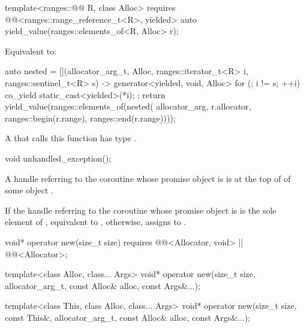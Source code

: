 %
\begin{itemdecl}
template<ranges::@@ R, class Alloc>
  requires @@<ranges::range_reference_t<R>, yielded>
  auto yield_value(ranges::elements_of<R, Alloc> r);
\end{itemdecl}

\begin{itemdescr}
\pnum
\effects
Equivalent to:
\begin{codeblock}
auto nested = [](allocator_arg_t, Alloc, ranges::iterator_t<R> i, ranges::sentinel_t<R> s)
  -> generator<yielded, void, Alloc> {
    for (; i != s; ++i) {
      co_yield static_cast<yielded>(*i);
    }
  };
return yield_value(ranges::elements_of(nested(
  allocator_arg, r.allocator, ranges::begin(r.range), ranges::end(r.range))));
\end{codeblock}

\pnum
\begin{note}
A  that calls this function
has type .
\end{note}
\end{itemdescr}

%
\begin{itemdecl}
void unhandled_exception();
\end{itemdecl}

\begin{itemdescr}
\pnum
\expects
A handle referring to the coroutine whose promise object is 
is at the top of 
of some  object .

\pnum
\effects
If the handle referring to the coroutine
whose promise object is 
is the sole element of ,
equivalent to ,
otherwise, assigns  to .
\end{itemdescr}

%
\begin{itemdecl}
void* operator new(size_t size)
  requires @@<Allocator, void> || @@<Allocator>;

template<class Alloc, class... Args>
  void* operator new(size_t size, allocator_arg_t, const Alloc& alloc, const Args&...);

template<class This, class Alloc, class... Args>
  void* operator new(size_t size, const This&, allocator_arg_t, const Alloc& alloc,
                     const Args&...);
\end{itemdecl}

